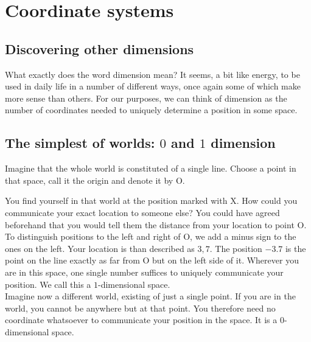 \chapter{Coordinate systems}
\label{Coordinates}

\section{Discovering other dimensions}

\noindent What exactly does the word dimension mean? It seems, a bit like energy, to be used in daily life in a number of different ways, once again some of which make more sense than others. For our purposes, we can think of dimension as the number of coordinates needed to uniquely determine a position in some space.\\

\section{The simplest of worlds: $0$ and $1$ dimension}

\noindent Imagine that the whole world is constituted of a single line. Choose a point in that space, call it the origin and denote it by O.
\begin{center}
\end{center} 
\noindent You find yourself in that world at the position marked with X. How could you communicate your exact location to someone else? You could have agreed beforehand that you would tell them the distance from your location to point O. To distinguish positions to the left and right of O, we add a minus sign to the ones on the left. Your location is than described as $3,7$. The position $-3.7$ is the point on the line exactly as far from O but on the left side of it. Wherever you are in this space, one single number suffices to uniquely communicate your position. We call this a $1$-dimensional space.\\

\noindent Imagine now a different world, existing of just a single point. If you are in the world, you cannot be anywhere but at that point. You therefore need no coordinate whatsoever to communicate your position in the space. It is a $0$-dimensional space.

